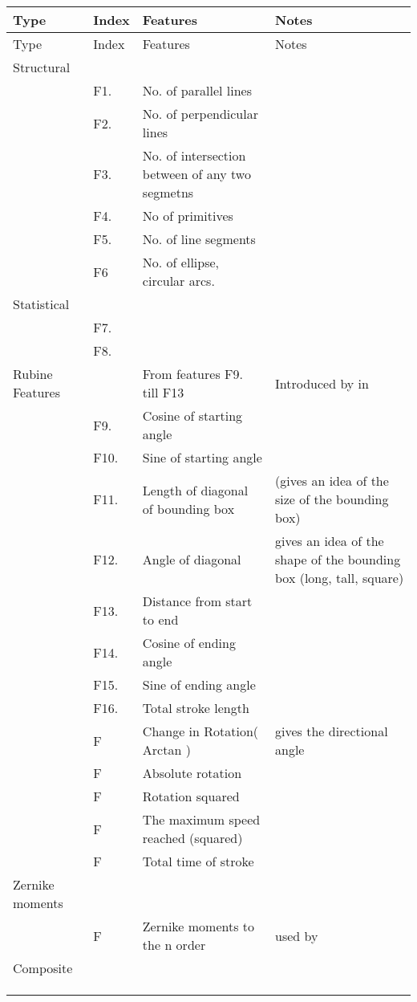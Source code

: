 
\begin{longtable}{|l|l|p{6cm}|p{5cm}|}
\hline 
Type  & Index  & Features  & Notes \tabularnewline
\endhead
\hline 
Type  & Index  & Features  & Notes \tabularnewline
\endfirsthead
\hline 
Structural  & \multicolumn{1}{c||}{} &  & \tabularnewline
\hline 
 & F1.  & No. of parallel lines  & \tabularnewline
\hline 
 & F2.  & No. of perpendicular lines  & \tabularnewline
\hline 
 & F3.  & No. of intersection between of any two segmetns  & \tabularnewline
\hline 
 & F4.  & No of primitives  & \tabularnewline
\hline 
 & F5.  & No. of line segments  & \tabularnewline
\hline 
 & F6  & No. of ellipse, circular arcs.  & \tabularnewline
\hline 
Statistical  &  &  & \tabularnewline
\hline 
 & F7.  &  & \tabularnewline
\hline 
 & F8.  &  & \tabularnewline
\hline 
Rubine Features  &  & From features F9. till F13  & Introduced by in \cite{gestureexample12} \tabularnewline
\hline 
 & F9.  & Cosine of starting angle  & \tabularnewline
\hline 
 & F10.  & Sine of starting angle  & \tabularnewline
\hline 
 & F11.  & Length of diagonal of bounding box  & (gives an idea of the size of the bounding box) \tabularnewline
\hline 
 & F12.  & Angle of diagonal  & gives an idea of the shape of the bounding box (long, tall, square) \tabularnewline
\hline 
 & F13.  & Distance from start to end  & \tabularnewline
\hline 
 & F14.  & Cosine of ending angle  & \tabularnewline
\hline 
 & F15.  & Sine of ending angle  & \tabularnewline
\hline 
 & F16.  & Total stroke length  & \tabularnewline
\hline 
 & F  & Change in Rotation( Arctan ) & gives the directional angle \tabularnewline
\hline 
 & F  & Absolute rotation  & \tabularnewline
\hline 
 & F  & Rotation squared  & \tabularnewline
\hline 
 & F  & The maximum speed reached (squared)  & \tabularnewline
\hline 
 & F  & Total time of stroke  & \tabularnewline
\hline 
Zernike moments  &  &  & \tabularnewline
\hline 
 & F  & Zernike moments to the n order  & used by \cite{zernike61} \tabularnewline
Composite  &  &  & \tabularnewline
\hline 
 &  &  & \tabularnewline
\hline 
 &  &  & \tabularnewline
\hline 
 &  &  & \tabularnewline
\hline
\end{longtable}

